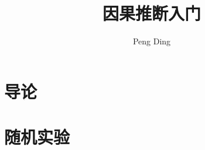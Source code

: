 \documentclass[krantz1]{krantz}
\begin{document}
\frontmatter

\title{因果推断入门}
\author{Peng Ding}

\maketitle




\tableofcontents
%





\mainmatter





\makeatletter
{}
\makeatother

\renewcommand {\theexample} {\thechapter.\arabic{example}}
\renewcommand {\theassumption} {\thechapter.\arabic{assumption}}
\renewcommand {\thelemma} {\thechapter.\arabic{lemma}}
\renewcommand {\thetheorem} {\thechapter.\arabic{theorem}}
\renewcommand {\theremark} {\thechapter.\arabic{remark}}
\renewcommand {\thecondition} {\thechapter.\arabic{condition}}
\renewcommand {\thecorollary} {\thechapter.\arabic{corollary}}
\renewcommand {\theproposition} {\thechapter.\arabic{proposition}}
\renewcommand {\thedefinition} {\thechapter.\arabic{definition}}

 
 
 
\part{导论}\label{part::introduction}
 
  
 
\part{随机实验}\label{part::rcts}
  
  

   
   
    
      
   
\end{document}
